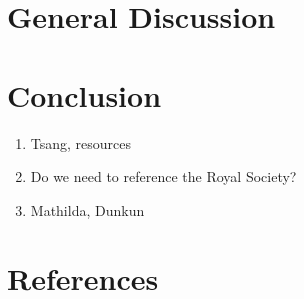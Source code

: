 \documentclass[10pt]{iopart}
\begin{document}


\section{General Discussion}



\section{Conclusion}

\ack

\begin{enumerate}
	\item Tsang, resources
	\item Do we need to reference the Royal Society?
	\item Mathilda, Dunkun
\end{enumerate}

\section*{References}


\end{document}
